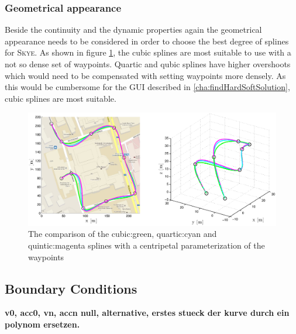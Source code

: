 \subsubsection{Geometrical appearance}
Beside the continuity and the dynamic properties again the geometrical appearance needs to be considered in order to choose the best degree of splines for \textsc{Skye}. As shown in figure \ref{fig:degreeCentripetal}, the cubic splines are most suitable to use with a not so dense set of waypoints. Quartic and qubic splines have higher overshoots which would need to be compensated with setting waypoints more densely. As this would be cumbersome for the GUI described in \ref{cha:findHardSoftSolution}, cubic splines are most suitable. 

\begin{figure}[H]
  \begin{minipage}[t]{1\textwidth}
    \includegraphics[width = \textwidth]{graphics/DegreeCentripetal_road_agile.eps}
  \end{minipage}
  \caption{The comparison of the cubic:green, quartic:cyan and quintic:magenta splines with a centripetal parameterization of the waypoints}
  \label{fig:degreeCentripetal}
\end{figure} 






\subsection{Boundary Conditions}
\label{subsec:boundary conditions}
{\bf v0, acc0, vn, accn null, alternative, erstes stueck der kurve durch ein polynom ersetzen.}

